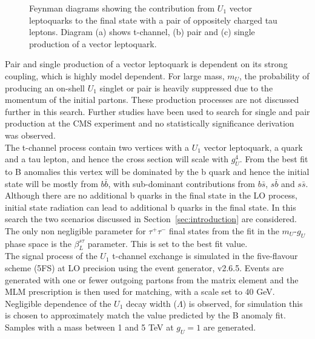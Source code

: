 \begin{figure}[H]
\begin{subfigure}[b]{0.3\textwidth}
\caption{}
\end{subfigure}

\caption{Feynman diagrams showing the contribution from $U_1$ vector leptoquarks to the final state with a pair of oppositely charged tau leptons. Diagram (a) shows t-channel, (b) pair and (c) single production of a vector leptoquark.}
\label{fig:leptoquark_feynman}
\end{figure}

Pair and single production of a vector leptoquark is dependent on its strong coupling, which is highly model dependent.
For large mass, $m_U$, the probability of producing an on-shell $U_1$ singlet or pair is heavily suppressed due to the momentum of the initial partons.
These production processes are not discussed further in this search.
Further studies have been used to search for single and pair production at the CMS experiment and no statistically significance derivation was observed. \\

The t-channel process contain two vertices with a $U_1$ vector leptoquark, a quark and a tau lepton, and hence the cross section will scale with $g_{U}^4$.
From the best fit to B anomalies this vertex will be dominated by the b quark and hence the initial state will be mostly from $b\bar{b}$, with sub-dominant contributions from $b\bar{s}$, $s\bar{b}$ and $s\bar{s}$.
Although there are no additional b quarks in the final state in the LO process, initial state radiation can lead to additional b quarks in the final state.
In this search the two scenarios discussed in Section~\ref{sec:introduction} are considered.
The only non negligible parameter for $\tau^{+}\tau^{-}$ final states from the fit in the $m_{U}$-$g_{U}$ phase space is the $\beta_{L}^{s\tau}$ parameter.
This is set to the best fit value. \\

The signal process of the $U_1$ t-channel exchange is simulated in the five-flavour scheme (5FS) at LO precision using the \MGvATNLO event generator, v2.6.5.
Events are generated with one or fewer outgoing partons from the matrix element and the MLM prescription is then used for matching, with a scale set to 40 GeV.
Negligible dependence of the $U_1$ decay width ($\Lambda$) is observed, for simulation this is chosen to approximately match the value predicted by the B anomaly fit.
Samples with a mass between 1 and 5 TeV at $g_U = 1$ are generated. \\

